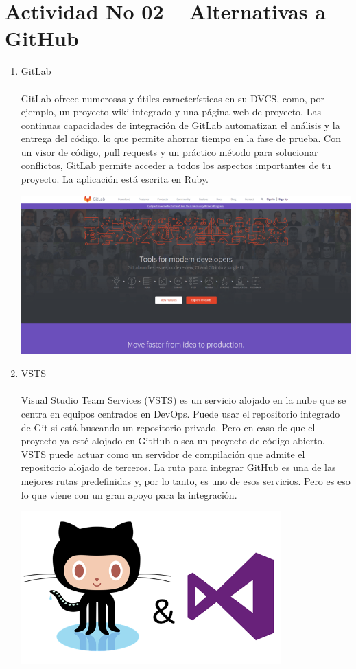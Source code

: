 \section{Actividad No 02 – Alternativas a GitHub} 

\begin{enumerate}[1.]
	\item GitLab
	\\
	\\GitLab ofrece numerosas y útiles características en su DVCS, como, por ejemplo, un proyecto wiki integrado y una página web de proyecto. Las continuas capacidades de integración de GitLab automatizan el análisis y la entrega del código, lo que permite ahorrar tiempo en la fase de prueba. Con un visor de código, pull requests y un práctico método para solucionar conflictos, GitLab permite acceder a todos los aspectos importantes de tu proyecto. La aplicación está escrita en Ruby.

	\begin{center}
	\includegraphics[width=15cm]{./Imagenes/git1} 
	\end{center}



	\item VSTS
	\\
	\\Visual Studio Team Services (VSTS) es un servicio alojado en la nube que se centra en equipos centrados en DevOps. Puede usar el repositorio integrado de Git si está buscando un repositorio privado. Pero en caso de que el proyecto ya esté alojado en GitHub o sea un proyecto de código abierto. VSTS puede actuar como un servidor de compilación que admite el repositorio alojado de terceros. La ruta para integrar GitHub es una de las mejores rutas predefinidas y, por lo tanto, es uno de esos servicios. Pero es eso lo que viene con un gran apoyo para la integración.
	
	\begin{center}
	\includegraphics[width=10cm]{./Imagenes/git2} 
	\end{center}


\end{enumerate}

